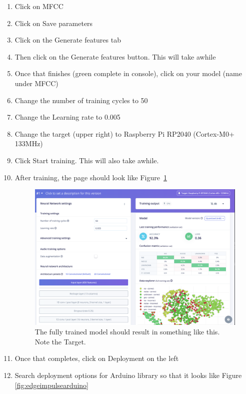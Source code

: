 \begin{enumerate}
  \item Click on MFCC
  \item Click on Save parameters
  \item Click on the Generate features tab
  \item Then click on the Generate features button. This will take awhile
  \item Once that finishes (green complete in console), click on your model 
          (name under MFCC)
  \item Change the number of training cycles to 50
  \item Change the Learning rate to 0.005
  \item Change the target (upper right) to Raspberry Pi RP2040 (Cortex-M0+ 133MHz)
  \item Click Start training. This will also take awhile. 
  \item After training, the page should look like Figure~\ref{fig:edgeimpulsetrained}

  \begin{figure}[!htb]
    \centering
    \includegraphics[scale=0.3]{machineLearning/trained.png}
    \caption{The fully trained model should result in something like this. Note the Target.}
    \label{fig:edgeimpulsetrained}
  \end{figure} 

  \item Once that completes, click on Deployment on the left 
  \item Search deployment options for Arduino library so that it looks like Figure \ref{fig:edgeimpulsearduino}


\end{enumerate}
